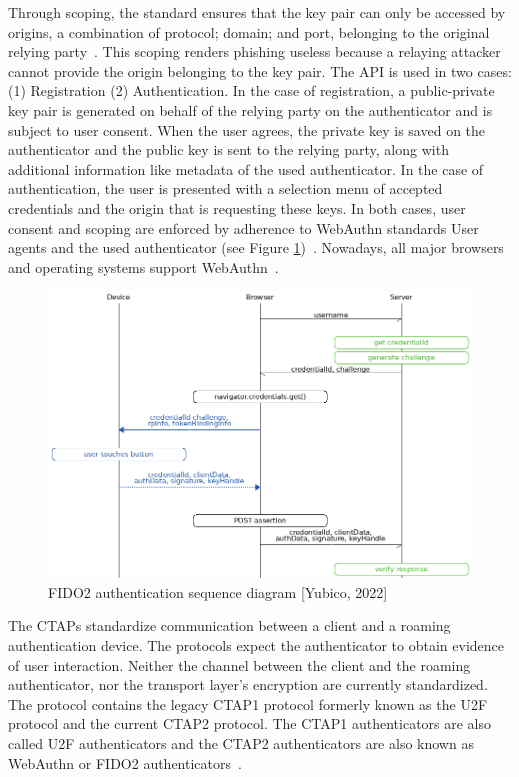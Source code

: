 \documentclass[runningheads]{llncs}
\begin{document}
Through scoping, the standard ensures that the key pair can only be accessed by origins, a combination of protocol; domain; and port, belonging to the original relying party~\cite{274610}. This scoping renders phishing useless because a relaying attacker cannot provide the origin belonging to the key pair. The API is used in two cases: (1) Registration (2) Authentication. In the case of registration, a public-private key pair is generated on behalf of the relying party on the authenticator and is subject to user consent. When the user agrees, the private key is saved on the authenticator and the public key is sent to the relying party, along with additional information like metadata of the used authenticator. In the case of authentication, the user is presented with a selection menu of accepted credentials and the origin that is requesting these keys. In both cases, user consent and scoping are enforced by adherence to WebAuthn standards User agents and the used authenticator (see Figure \ref{figure_one})~\cite{000002}. Nowadays, all major browsers and operating systems support WebAuthn~\cite{000001}.

\begin{figure}[ht]
  \centering
  \includegraphics[width=\textwidth]{references/fido_flow_by_yubico.png}
  \caption{FIDO2 authentication sequence diagram [Yubico, 2022]}
  \label{figure_one}
\end{figure}

The CTAPs standardize communication between a client and a roaming authentication device. The protocols expect the authenticator to obtain evidence of user interaction. Neither the channel between the client and the roaming authenticator, nor the transport layer's encryption are currently standardized. The protocol contains the legacy CTAP1 protocol formerly known as the U2F protocol and the current CTAP2 protocol. The CTAP1 authenticators are also called U2F authenticators and the CTAP2 authenticators are also known as WebAuthn or FIDO2 authenticators~\cite{000003,274547,9099190}.
\end{document}
